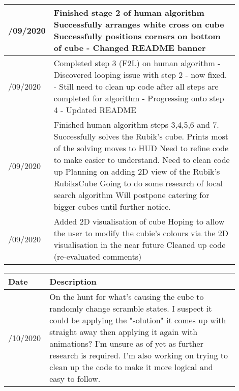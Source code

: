 \documentclass[12pt]{report} %
\begin{document}
\begin{table}[!ht]
\begin{tabular}{
        |>{\centering\arraybackslash}p{0.1\linewidth}
        |p{0.8\linewidth}|}
    \\ \hline
    13/09/2020  &   
    Finished stage 2 of human algorithm \newline
    Successfully arranges white cross on cube   \newline
    Successfully positions corners on bottom of cube    \newline
    - Changed README banner
    \\ \hline
    15/09/2020  &
    Completed step 3 (F2L) on human algorithm   \newline
    - Discovered looping issue with step 2 - now fixed. \newline
    - Still need to clean up code after all steps are completed for algorithm   \newline
    - Progressing onto step 4   \newline
    - Updated README
    \\ \hline
    17/09/2020  &
    Finished human algorithm steps 3,4,5,6 and 7.   \newline
    Successfully solves the Rubik's cube.   \newline
    Prints most of the solving moves to HUD \newline
    Need to refine code to make easier to understand.   \newline
    Need to clean code up   \newline
    Planning on adding 2D view of the Rubik's RubiksCube    \newline
    Going to do some research of local search algorithm \newline
    Will postpone catering for bigger cubes until further notice.   \newline
    \\ \hline
    19/09/2020  &
    Added 2D visualisation of cube \newline
    Hoping to allow the user to modify the cubie's colours via the 2D visualisation in the near future
    Cleaned up code (re-evaluated comments)
    \\ \hline
    \end{tabular}
\end{table}

\begin{table}
    \centering
    \begin{tabular}{
        |>{\centering\arraybackslash}p{0.1\linewidth}
        |p{0.8\linewidth}|}
    \hline
    \textbf{Date} & \textbf{Description} \\ \hline
    28/10/2020  &
    On the hunt for what's causing the cube to randomly change scramble states. I suspect it could be applying the "solution" it comes up with straight away then applying it again with animations? I'm unsure as of yet as further research is required.\newline
    I'm also working on trying to clean up the code to make it more logical and easy to follow.
    \\ \hline
    \end{tabular}
\end{table}
\end{document}
